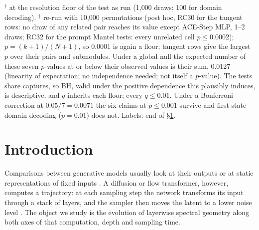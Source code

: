 \documentclass[11pt]{article}
\begin{document}
\begin{table}[p]
\par\smallskip\raggedright\scriptsize $^{\dagger}$ at the resolution floor of the test as run (1{,}000 draws; 100 for domain decoding). $^{\ddagger}$ re-run with 10{,}000 permutations (post hoc, RC30 for the tangent rows: no draw of any related pair reaches its value except ACE-Step MLP, 1--2 draws; RC32 for the prompt Mantel tests: every unrelated cell $p\le0.0002$); $p=(k+1)/(N+1)$, so $0.0001$ is again a floor; tangent rows give the largest $p$ over their pairs and submodules. Under a global null the expected number of these seven $p$-values at or below their observed values is their sum, $0.0127$ (linearity of expectation; no independence needed; not itself a $p$-value). The tests share captures, so BH, valid under the positive dependence this plausibly induces, is descriptive, and $q$ inherits each floor; every $q\le0.01$. Under a Bonferroni correction at $0.05/7=0.0071$ the six claims at $p\le0.001$ survive and first-state domain decoding ($p=0.01$) does not. Labels: end of \S\ref{sec:intro}.
\end{table}

{\small\tableofcontents}
\newpage

\section{Introduction}\label{sec:intro}

Comparisons between generative models usually look at their outputs or at static representations of fixed inputs \citep{raghu2017svcca,kornblith2019similarity}. A diffusion or flow transformer, however, computes a trajectory: at each sampling step the network transforms its input through a stack of layers, and the sampler then moves the latent to a lower noise level \citep{ho2020denoising,song2021scorebased,lipman2023flow,liu2023flow}. The object we study is the evolution of layerwise spectral geometry along both axes of that computation, depth and sampling time.
\end{document}
